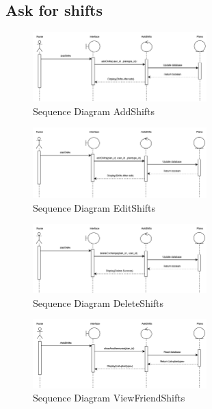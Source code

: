 \subsection{Ask for shifts}

    \begin{figure}[h]
    \centering
    \includegraphics[width=0.6\textwidth]{Sequence 2.1.png}
    \caption{Sequence Diagram AddShifts}
    \end{figure}

    \begin{figure}[h]
    \centering
    \includegraphics[width=0.6\textwidth]{Sequence 2.2.png}
    \caption{Sequence Diagram EditShifts}
    \end{figure}

    \begin{figure}[h]
    \centering
    \includegraphics[width=0.6\textwidth]{Sequence 2.3.png}
    \caption{Sequence Diagram DeleteShifts}
    \end{figure}

    \begin{figure}[h]
    \centering
    \includegraphics[width=0.6\textwidth]{Sequence 2.4.png}
    \caption{Sequence Diagram ViewFriendShifts}
    \end{figure}


